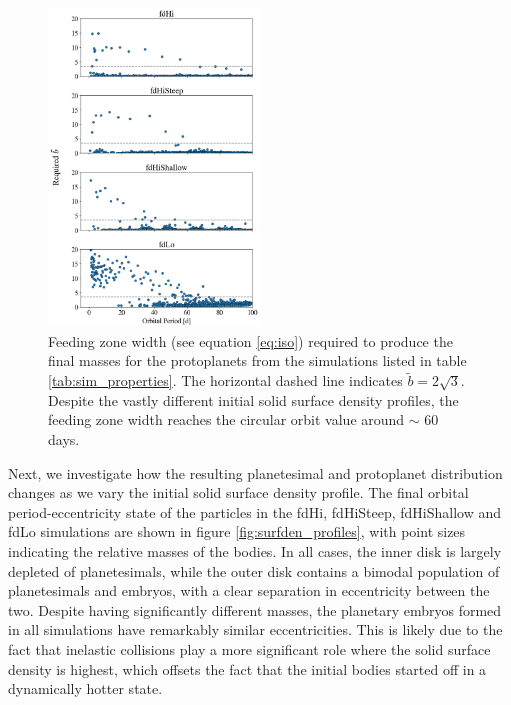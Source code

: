 \documentclass[twocolumn]{aastex63}
\begin{document}
\begin{figure}
\begin{center}
    \includegraphics[width=0.5\textwidth]{figures/surfden_b.png}
    \caption{Feeding zone width (see equation \ref{eq:iso}) required to produce the final masses for the protoplanets from the simulations listed in table \ref{tab:sim_properties}. The horizontal dashed line indicates $\tilde{b} = 2 \sqrt{3}$. Despite the vastly different initial solid surface density profiles, the feeding zone width reaches the circular orbit value around $\sim$ 60 days. \label{fig:surfden_b}}
\end{center}
\end{figure}



Next, we investigate how the resulting planetesimal and protoplanet distribution
changes as we vary the initial solid surface density profile.
The final orbital period-eccentricity state of the
particles in the fdHi, fdHiSteep, fdHiShallow and fdLo simulations are shown in figure \ref{fig:surfden_profiles}, with point sizes indicating the relative masses of the bodies. In all cases, the inner disk is largely depleted of planetesimals, while the outer disk contains a bimodal population of planetesimals and embryos, with a clear separation in eccentricity between the two. Despite having significantly different masses, the planetary embryos formed in all simulations have remarkably similar eccentricities. This is likely due to the fact that inelastic collisions play a more significant role where the solid surface density is highest, which offsets the fact that the initial bodies started off in a dynamically hotter state.
\end{document}
